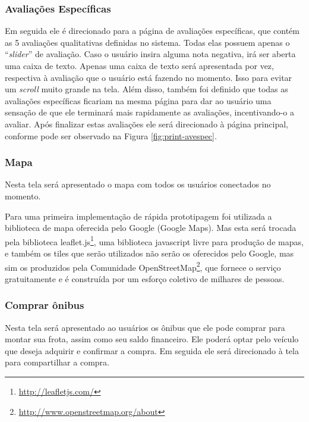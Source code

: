 \subsubsection{Avaliações Específicas}
Em seguida ele é direcionado para a página de avaliações específicas, que contém as 5 avaliações qualitativas definidas no sistema. Todas elas possuem apenas o ``\textit{slider}'' de avaliação. Caso o usuário insira alguma nota negativa, irá ser aberta uma caixa de texto. Apenas uma caixa de texto será apresentada por vez, respectiva à avaliação que o usuário está fazendo no momento. Isso para evitar um \textit{scroll} muito grande na tela. Além disso, também foi definido que todas as avaliações específicas ficariam na mesma página para dar ao usuário uma sensação de que ele terminará mais rapidamente as avaliações, incentivando-o a avaliar. Após finalizar estas avaliações ele será direcionado à página principal, conforme pode ser observado na Figura \ref{fig:print-avespec}.
    
\subsubsection{Mapa}
Nesta tela será apresentado o mapa com todos os usuários conectados no momento.
    
Para uma primeira implementação de rápida prototipagem foi utilizada a biblioteca de mapa oferecida pelo Google (Google Maps). Mas esta será trocada pela biblioteca leaflet.js\footnote{\url{http://leafletjs.com/}}, uma biblioteca javascript livre para produção de mapas, e também os tiles que serão utilizados não serão os oferecidos pelo Google, mas sim os produzidos pela Comunidade OpenStreetMap\footnote{\url{http://www.openstreetmap.org/about}}, que fornece o serviço gratuitamente e é construída por um esforço coletivo de milhares de pessoas.
    
\subsubsection{Comprar ônibus}
Nesta tela será apresentado ao usuários os ônibus que ele pode comprar para montar sua frota, assim como seu saldo financeiro. Ele poderá optar pelo veículo que deseja adquirir e confirmar a compra. Em seguida ele será direcionado à tela para compartilhar a compra.
    
